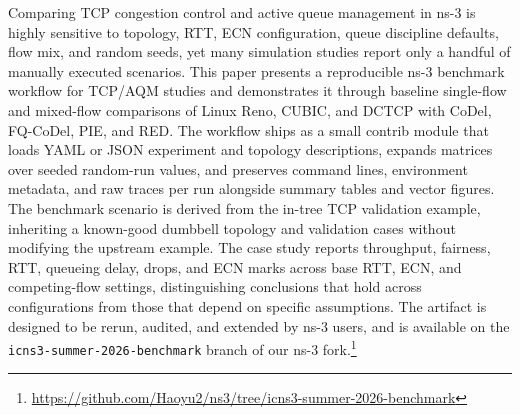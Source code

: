 Comparing TCP congestion control and active queue management in ns-3 is highly sensitive to topology, RTT, ECN configuration, queue discipline defaults, flow mix, and random seeds, yet many simulation studies report only a handful of manually executed scenarios. This paper presents a reproducible ns-3 benchmark workflow for TCP/AQM studies and demonstrates it through baseline single-flow and mixed-flow comparisons of Linux Reno, CUBIC, and DCTCP with CoDel, FQ-CoDel, PIE, and RED. The workflow ships as a small contrib module that loads YAML or JSON experiment and topology descriptions, expands matrices over seeded random-run values, and preserves command lines, environment metadata, and raw traces per run alongside summary tables and vector figures. The benchmark scenario is derived from the in-tree TCP validation example, inheriting a known-good dumbbell topology and validation cases without modifying the upstream example. The case study reports throughput, fairness, RTT, queueing delay, drops, and ECN marks across base RTT, ECN, and competing-flow settings, distinguishing conclusions that hold across configurations from those that depend on specific assumptions. The artifact is designed to be rerun, audited, and extended by ns-3 users, and is available on the \texttt{icns3-summer-2026-benchmark} branch of our ns-3 fork.\footnote{\url{https://github.com/Haoyu2/ns3/tree/icns3-summer-2026-benchmark}}
